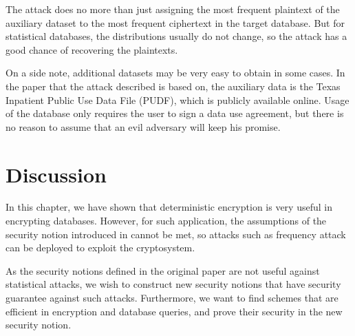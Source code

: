 \documentclass[10pt]{book}
\begin{document}
\begin{center}
\end{center}

The attack does no more than just assigning the most frequent plaintext of the auxiliary dataset to the most frequent ciphertext in the target database. But for statistical databases, the distributions usually do not change, so the attack has a good chance of recovering the plaintexts.

On a side note, additional datasets may be very easy to obtain in some cases. In the paper that the attack described is based on, the auxiliary data is the Texas Inpatient Public Use Data File (PUDF), which is publicly available online. Usage of the database only requires the user to sign a data use agreement, but there is no reason to assume that an evil adversary will keep his promise.




\section{Discussion}
In this chapter, we have shown that deterministic encryption is very useful in encrypting databases. However, for such application, the assumptions of the security notion introduced in \cite{Bellare2007, Boldyreva2008, Bellare2008} cannot be met, so attacks such as frequency attack \cite{Naveed:2015:IAP:2810103.2813651} can be deployed to exploit the cryptosystem.

As the security notions defined in the original paper are not useful against statistical attacks, we wish to construct new security notions that have security guarantee against such attacks. Furthermore, we want to find schemes that are efficient in encryption and database queries, and prove their security in the new security notion. 









{}
\end{document}
